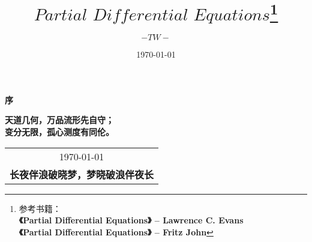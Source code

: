\title{{\Huge{\textbf{$Partial \,\, Differential \,\, Equations$}}}\footnote{参考书籍：\\
			\hspace*{4em} \textbf{《Partial Differential Equations》 -- Lawrence C. Evans} \\
			\hspace*{4em} \textbf{《Partial Differential Equations》 -- Fritz John}
			}}
\author{$-TW-$}
\date{\today}
\maketitle                   %

\thispagestyle{empty}        %
\begin{center}
	\Huge\textbf{序}
\end{center}


\vspace*{3em}
\begin{center}
	\large{\textbf{天道几何，万品流形先自守；}}\\
	
	\large{\textbf{变分无限，孤心测度有同伦。}}
\end{center}

\vspace*{3em}
\begin{flushright}
	\begin{tabular}{c}
		\today \\ \small{\textbf{长夜伴浪破晓梦，梦晓破浪伴夜长}}
	\end{tabular}
\end{flushright}


\newpage                      %
\pagestyle{plain}             %
\setcounter{page}{1}          %
\tableofcontents              %

\newpage                      %
\pagestyle{plain}
\setcounter{page}{1}          %
\setcounter{chapter}{0}    %